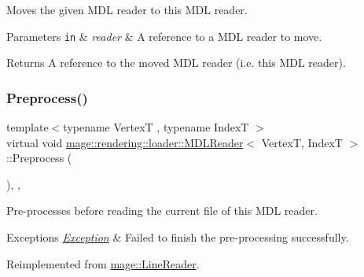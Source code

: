 Moves the given M\+DL reader to this M\+DL reader.


\begin{DoxyParams}[1]{Parameters}
\mbox{\tt in}  & {\em reader} & A reference to a M\+DL reader to move. \\
\hline
\end{DoxyParams}
\begin{DoxyReturn}{Returns}
A reference to the moved M\+DL reader (i.\+e. this M\+DL reader). 
\end{DoxyReturn}
\mbox{\label{classmage_1_1rendering_1_1loader_1_1_m_d_l_reader_a397f0c0eedc56c983fc3a7074aa4e577}} 
\subsubsection{\texorpdfstring{Preprocess()}{Preprocess()}}
{\footnotesize\ttfamily template$<$typename VertexT , typename IndexT $>$ \\
virtual void \mbox{\hyperlink{classmage_1_1rendering_1_1loader_1_1_m_d_l_reader}{mage\+::rendering\+::loader\+::\+M\+D\+L\+Reader}}$<$ VertexT, IndexT $>$\+::Preprocess (\begin{DoxyParamCaption}{ }\end{DoxyParamCaption})\hspace{0.3cm}{\ttfamily [override]}, {\ttfamily [private]}, {\ttfamily [virtual]}}

Pre-\/processes before reading the current file of this M\+DL reader.


\begin{DoxyExceptions}{Exceptions}
{\em \mbox{\hyperlink{classmage_1_1_exception}{Exception}}} & Failed to finish the pre-\/processing successfully. \\
\hline
\end{DoxyExceptions}


Reimplemented from \mbox{\hyperlink{classmage_1_1_line_reader_ad81a84bf9ecd81b9a391698afbd5eb61}{mage\+::\+Line\+Reader}}.

\mbox{\label{classmage_1_1rendering_1_1loader_1_1_m_d_l_reader_aba8857b3d0f49250e312bd737d7d0e9c}} 
